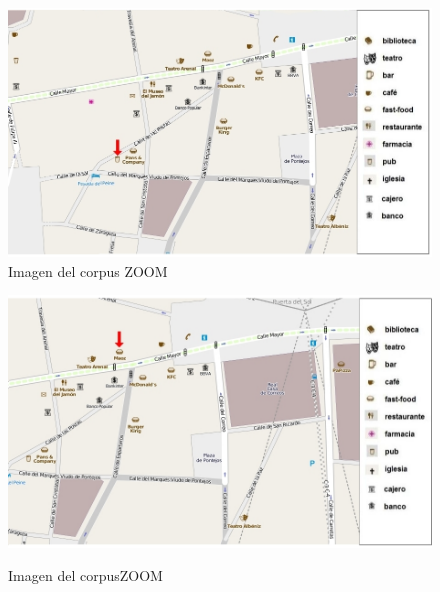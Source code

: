 \begin{figure}
\begin{minipage}[b]{0.5\linewidth}
\centering
\includegraphics[width=\textwidth]{images/corpus/mapa13.png}\\[0pt]
\caption{Imagen del corpus ZOOM}
\label{mapa13}
\end{minipage}
\hspace*{0cm}
\begin{minipage}[b]{0.5\linewidth}
\centering
\includegraphics[width=\textwidth]{images/corpus/mapa14.png}\\[0pt]
\caption{Imagen del corpusZOOM}
\label{mapa14}
\end{minipage}
\end{figure}

